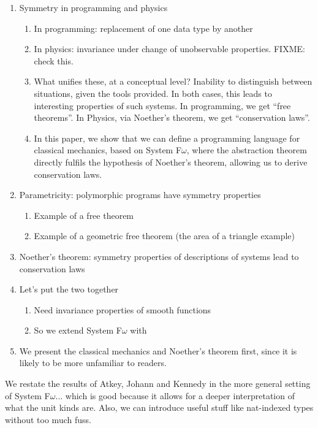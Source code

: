 \documentclass[preprint]{sigplanconf}
\theoremstyle{examplestyle}
\begin{document}
\begin{enumerate}
\item Symmetry in programming and physics
  \begin{enumerate}
  \item In programming: replacement of one data type by another
  \item In physics: invariance under change of unobservable
    properties. FIXME: check this.
  \item What unifies these, at a conceptual level? Inability to
    distinguish between situations, given the tools provided. In both
    cases, this leads to interesting properties of such systems. In
    programming, we get ``free theorems''. In Physics, via Noether's
    theorem, we get ``conservation laws''.
  \item In this paper, we show that we can define a programming
    language for classical mechanics, based on System F$\omega$, where
    the abstraction theorem directly fulfils the hypothesis of
    Noether's theorem, allowing us to derive conservation laws.
  \end{enumerate}
\item Parametricity: polymorphic programs have symmetry properties
  \begin{enumerate}
  \item Example of a free theorem
  \item Example of a geometric free theorem (the area of a triangle
    example)
  \end{enumerate}
\item Noether's theorem: symmetry properties of descriptions of
  systems lead to conservation laws
\item Let's put the two together
  \begin{enumerate}
  \item Need invariance properties of smooth functions
  \item So we extend System F$\omega$ with 
  \end{enumerate}
\item We present the classical mechanics and Noether's theorem first,
  since it is likely to be more unfamiliar to readers.
\end{enumerate}

We restate the results of Atkey, Johann and Kennedy in the more
general setting of System F$\omega$... which is good because it allows
for a deeper interpretation of what the unit kinds are. Also, we can
introduce useful stuff like nat-indexed types without too much fuss.
\end{document}

